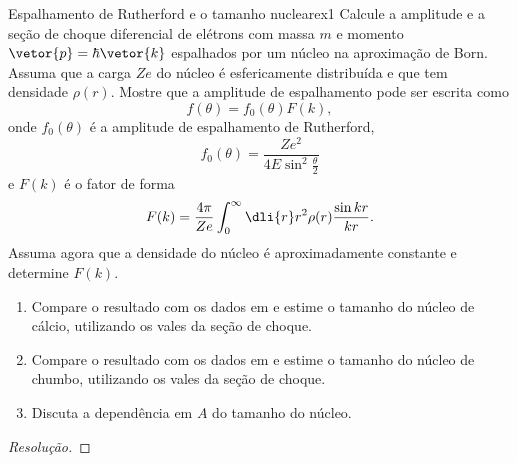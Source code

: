 \begin{exercício}{Espalhamento de Rutherford e o tamanho nuclear}{ex1}
   Calcule a amplitude e a seção de choque diferencial de elétrons com massa \(m\) e momento \(\vetor{p} = \hbar \vetor{k}\) espalhados por um núcleo na aproximação de Born. Assuma que a carga \(Ze\) do núcleo é esfericamente distribuída e que tem densidade \(\rho(r)\). Mostre que a amplitude de espalhamento pode ser escrita como
   \begin{equation*}
       f(\theta) = f_0(\theta) F(k),
   \end{equation*}
   onde \(f_0(\theta)\) é a amplitude de espalhamento de Rutherford,
   \begin{equation*}
      f_0(\theta) = \frac{Ze^2}{4E\sin^2\frac{\theta}{2}}
   \end{equation*}
   e \(F(k)\) é o fator de forma
   \begin{equation*}
      F(k) = \frac{4\pi}{Ze} \int_0^\infty \dli{r} r^2 \rho(r) \frac{\sin kr}{kr}.
   \end{equation*}
   Assuma agora que a densidade do núcleo é aproximadamente constante e determine \(F(k).\)
   \begin{enumerate}[label=(\alph*)]
      \item Compare o resultado com os dados em \cite{PhysRevLett.19.527} e estime o tamanho do núcleo de cálcio, utilizando os vales da seção de choque.
      \item Compare o resultado com os dados em \cite{PhysRevLett.19.242} e estime o tamanho do núcleo de chumbo, utilizando os vales da seção de choque.
      \item Discuta a dependência em \(A\) do tamanho do núcleo.
   \end{enumerate}
\end{exercício}
\begin{proof}[Resolução]
    
\end{proof}
